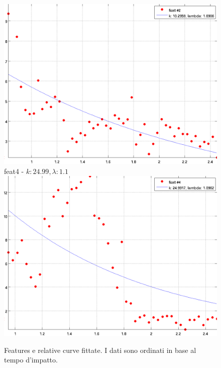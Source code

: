 \documentclass[12pt]{report}
\begin{document}
\begin{figure}[H]
\begin{minipage}[t]{0.5\linewidth}
	\includegraphics[scale=\imFeat]{images/feat2}\\
	feat4 - $k: 24.99, \lambda: 1.1 $\\
	\includegraphics[scale=\imFeat]{images/feat4}\\
\end{minipage}
\caption[short]{Features e relative curve fittate. I dati sono ordinati in base al tempo d'impatto.}
\label{fig:feats1}
\end{figure}
\end{document}
